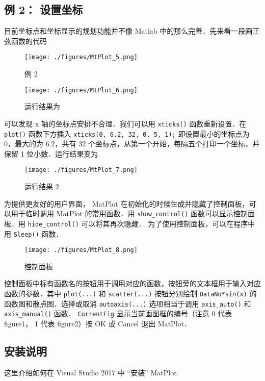 \subsection{例 2： 设置坐标}

目前坐标点和坐标显示的规划功能并不像 Matlab 中的那么完善．先来看一段画正弦函数的代码

\begin{figure}[ht]
\centering
\texttt{[image: ./figures/MtPlot\_5.png]}
\caption{例 2} \label{MtPlot_fig5}
\end{figure}

\begin{figure}[ht]
\centering
\texttt{[image: ./figures/MtPlot\_6.png]}
\caption{运行结果为} \label{MtPlot_fig6}
\end{figure}

可以发现 x 轴的坐标点安排不合理．我们可以用 \verb|xticks()| 函数重新设置．在 \verb|plot()| 函数下方插入
\verb|xticks(0, 6.2, 32, 0, 5, 1);|
即设置最小的坐标点为 0，最大的为 6.2，共有 32 个坐标点，从第一个开始，每隔五个打印一个坐标，并保留 1 位小数．运行结果变为

\begin{figure}[ht]
\centering
\texttt{[image: ./figures/MtPlot\_7.png]}
\caption{运行结果 2} \label{MtPlot_fig7}
\end{figure}

为提供更友好的用户界面， MatPlot 在初始化的时候生成并隐藏了控制面板，可以用于临时调用 MatPlot 的常用函数．用 \verb|show_control()| 函数可以显示控制面板．用 \verb|hide_control()| 可以将其再次隐藏． 为了使用控制面板，可以在程序中用 \verb|Sleep()| 函数．

\begin{figure}[ht]
\centering
\texttt{[image: ./figures/MtPlot\_8.png]}
\caption{控制面板} \label{MtPlot_fig8}
\end{figure}

控制面板中标有函数名的按钮用于调用对应的函数，按钮旁的文本框用于输入对应函数的参数．其中 \verb|plot(...)| 和 \verb|scatter(...)| 按钮分别绘制 \verb|DataNo*sin(x)| 的函数图和散点图．选择或取消 \verb|autoaxis(...)| 选项相当于调用 \verb|axis_auto()| 和 \verb|axis_manual()| 函数． \verb|CurrentFig| 显示当前画图框的编号（注意 0 代表 figure1， 1 代表 figure2）按 OK 或 Cancel 退出 MatPlot．


\subsection{安装说明}
这里介绍如何在 Visual Studio 2017 中 “安装” MatPlot. 

